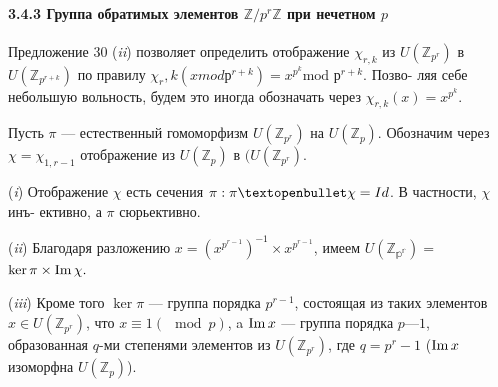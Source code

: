 \paragraph{3.4.3 Группа обратимых элементов	$\mathbb{Z}/p^r\mathbb{Z}$ при нечетном $p$}
\begin{lemma}
Предложение 30 (\textit{ii}) позволяет определить отображение $\chi_{r,k}$ из\linebreak
$U(\mathbb{Z}_{p^r})$ в $U(\mathbb{Z}_{p^{r+k}})$ по правилу $\chi_r,k(x mod р^{r+k}) = x^{p^k}\text{mod }р^{r + k}$. Позво-­\linebreak
ляя себе небольшую вольность, будем это иногда обозначать через\linebreak
$\chi_{r,k}(x)=x^{p^k}$.
\end{lemma}
\begin{predl}
Пусть $\pi$ — естественный гомоморфизм $U(\mathbb{Z}_{p^r})$ на $U(\mathbb{Z}_p)$. Обозначим\linebreak
через $\chi = \chi_{1,r-1}$ отображение из $U(\mathbb{Z}_p)$ в $(U(\mathbb{Z}_{p^r})$.
 
\par  (\textit{i}) Отображение $\chi$ есть сечения $\pi: \pi \textopenbullet \chi = Id$. В частности, $\chi$ инъ-\linebreak
ективно, а $\pi$ сюрьективно.
\par  (\textit{ii}) Благодаря разложению $x = {(x^{p^{r-1}})^{-1}} \times x^{p^{r-1}}$, имеем $U(\mathbb{Z_{p^r}})=$$\ker\pi \times \operatorname{Im} \chi.$
\par  (\textit{iii}) Кроме того $\ker \pi$ --- группа порядка $p^{r-1}$, состоящая из таких\linebreak
элементов $x \in U(\mathbb{Z}_{p^r})$, что $x \equiv 1 (\mod p)$, a $\operatorname{Im} x$ — группа порядка\linebreak
$p — 1$, образованная $q$-ми степенями элементов из $U(\mathbb{Z}_{p^r})$, где $q = p^r - 1$\linebreak
($\operatorname{Im} x$ изоморфна $U(\mathbb{Z}_p)$).
\end{predl}
